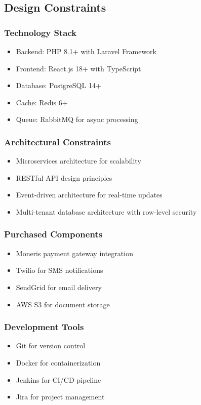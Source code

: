 \documentclass[12pt]{article}
\begin{document}
\subsection{Design Constraints}

\subsubsection{Technology Stack}
\begin{itemize}
    \item Backend: PHP 8.1+ with Laravel Framework
    \item Frontend: React.js 18+ with TypeScript
    \item Database: PostgreSQL 14+
    \item Cache: Redis 6+
    \item Queue: RabbitMQ for async processing
\end{itemize}

\subsubsection{Architectural Constraints}
\begin{itemize}
    \item Microservices architecture for scalability
    \item RESTful API design principles
    \item Event-driven architecture for real-time updates
    \item Multi-tenant database architecture with row-level security
\end{itemize}

\subsubsection{Purchased Components}
\begin{itemize}
    \item Moneris payment gateway integration
    \item Twilio for SMS notifications
    \item SendGrid for email delivery
    \item AWS S3 for document storage
\end{itemize}

\subsubsection{Development Tools}
\begin{itemize}
    \item Git for version control
    \item Docker for containerization
    \item Jenkins for CI/CD pipeline
    \item Jira for project management
\end{itemize}
\end{document}
